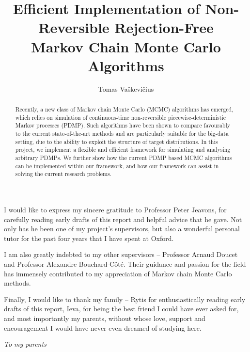 \documentclass[12pt]{ociamthesis}
\title{\vspace{-0.4cm}Efficient Implementation of Non-Reversible Rejection-Free \\
       Markov Chain Monte Carlo Algorithms}
\author{Tomas Vaškevičius}
\begin{document}
\maketitle

\begin{abstract}
Recently, a new class of Markov chain Monte Carlo (MCMC) algorithms has emerged, which
relies on simulation of continuous-time non-reversible piecewise-deterministic Markov processes (PDMP).
Such algorithms have been shown to compare favourably to the current state-of-the-art methods
and are particularly suitable for the big-data setting, due to the ability to exploit
the structure of target distributions.
In this project, we implement a flexible and efficient framework for
simulating and analysing arbitrary PDMPs.
We further show how the current PDMP based MCMC algorithms can be implemented within
our framework, and how our framework can assist in solving the current
research problems.
\end{abstract}

\begin{acknowledgements}
I would like to express my sincere gratitude to Professor Peter Jeavons, for carefully
reading early drafts of this report and helpful advice that he gave.
Not only has he been one of my project's supervisors,
but also a wonderful personal tutor
for the past four years that I have spent at Oxford.

I am also greatly indebted to my other supervisors -- Professor Arnaud Doucet
and Professor Alexandre Bouchard-C{\^o}t{\'e}.
Their guidance and passion for the field has immensely contributed to my appreciation of
Markov chain Monte Carlo methods.

Finally, I would like to thank my family -- Rytis for enthusiastically reading early
drafts of this report, Ieva, for being the best friend I could have ever asked
for, and most importantly my parents, without whose love, support
and encouragement I would have never even dreamed of studying here.
\end{acknowledgements}

\begin{dedication}
  \textit{To my parents}
\end{dedication}

\setcounter{tocdepth}{1}
\begin{romanpages}
\tableofcontents
\end{romanpages}



\appendix

\cleardoublepage
{}
\renewcommand{\bibname}{References}

\end{document}
